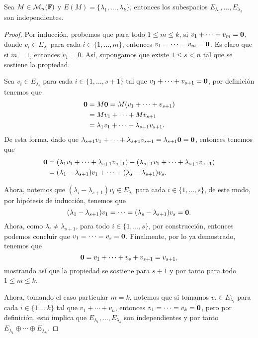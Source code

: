 \begin{teor}\label{teor:IndepEP}
  Sea $M \in \mathcal{M}_n(\mathbb{F})$ y $E(M) = \{\lambda_1, \ldots, \lambda_k\}$, entonces los subespacios $E_{\lambda_1}, \ldots, E_{\lambda_k}$ son independientes.
\end{teor}
\begin{proof}
  Por inducción, probemos que para todo $1\leq m \leq k$, si $v_1 + \cdots + v_m = \mathbf{0}$, donde $v_i \in E_{\lambda_i}$ para cada $i\in\{1,\ldots,m\}$, entonces $v_1 = \cdots = v_m = \mathbf{0}$. Es claro que si $m = 1$, entonces $v_1 = 0$. Así, supongamos que existe $1 \leq s < n$ tal que se sostiene la propiedad.

  Sea $v_i \in E_{\lambda_i}$ para cada $i\in\{1,\ldots,s+1\}$ tal que $v_1 + \cdots+ v_{s+1} = \mathbf{0}$, por definición tenemos que
  \begin{align*}
    \mathbf{0} &= M\mathbf{0} = M(v_1 + \cdots+ v_{s+1}) \\
      &= Mv_1 + \cdots+ Mv_{s+1} \\
      &= \lambda_1v_1 + \cdots+ \lambda_{s+1}v_{s+1}.
  \end{align*}
  De esta forma, dado que $\lambda_{s+1} v_1 + \cdots+ \lambda_{s+1} v_{s+1} = \lambda_{s+1}\mathbf{0} = \mathbf{0}$, entonces tenemos que 
    \begin{align*}
      \mathbf{0} &= (\lambda_1v_1 + \cdots+ \lambda_{s+1}v_{s+1}) - (\lambda_{s+1} v_1 + \cdots+ \lambda_{s+1} v_{s+1}) \\
        &= (\lambda_1 - \lambda_{s+1})v_1 + \cdots + (\lambda_s - \lambda_{s+1})v_s.
    \end{align*}
  
    Ahora, notemos que $(\lambda_i - \lambda_{s+1})v_{i} \in E_{\lambda_i}$ para cada $i \in \{1,\ldots,s\}$, de este modo, por hipótesis de inducción, tenemos que
      \[ (\lambda_1 - \lambda_{s+1})v_1 = \cdots = (\lambda_s - \lambda_{s+1})v_s = \mathbf{0}.\]
    Ahora, como  $\lambda_i \neq \lambda_{s+1}$, para todo $i \in \{1,\ldots,s\}$, por construcción, entonces podemos concluir que $v_1 = \cdots = v_s = \mathbf{0}$. Finalmente, por lo ya demostrado, tenemos que 
      \[ \mathbf{0} = v_1 + \cdots+ v_s + v_{s+1} = v_{s+1}, \]
    mostrando así que la propiedad se sostiene para $s+1$ y por tanto para todo $1 \leq m \leq k$.

    Ahora, tomando el caso particular $m = k$, notemos que si tomamos $v_i \in E_{\lambda_i}$ para cada $i \in \{1\ldots,k\}$ tal que $v_1 + \cdots + v_n$, entonces $v_1 = \cdots = v_k = \mathbf{0}$, pero por definición, esto implica que $E_{\lambda_1}, \ldots, E_{\lambda_k}$ son independientes y por tanto $E_{\lambda_1} \oplus \cdots \oplus E_{\lambda_k}$.
\end{proof}

